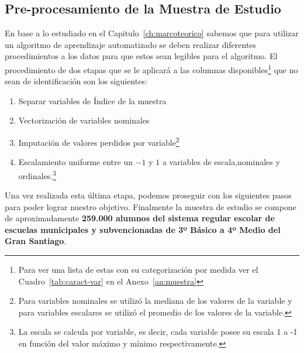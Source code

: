 \subsection{Pre-procesamiento de la Muestra de Estudio}
En base a lo estudiado en el Capitulo~\ref{ch:marcoteorico} sabemos que para utilizar un algoritmo de aprendizaje automatizado se deben realizar diferentes procedimientos a los datos para que estos sean legibles para el algoritmo. El procedimiento de dos etapas que se le aplicará a las columnas disponibles\footnote{Para ver una lista de estas con su categorización por medida ver el Cuadro~\ref{tab:caract-var} en el Anexo~\ref{an:muestra}} que no sean de identificación son los siguientes:
\begin{enumerate}[label=\Roman*]
\item Separar variables de Índice de la muestra
\item Vectorización de variables nominales
\item Imputación de valores perdidos por variable\footnote{Para variables nominales se utilizó la mediana de los valores de la variable y para variables escalares se utilizó el promedio de los valores de la variable. }
\item Escalamiento uniforme entre un $-1$ y $1$ a variables de escala,nominales y ordinales.\footnote{La escala se calcula por variable, es decir, cada variable posee su escala 1 a -1 en función del valor máximo y mínimo respectivamente.}
\end{enumerate}

Una vez realizada esta última etapa, podemos proseguir con los siguientes pasos para poder lograr nuestro objetivo. Finalmente la muestra de estudio se compone de aproximadamente \textbf{259.000 alumnos del sistema regular escolar de escuelas municipales y subvencionadas de 3º Básico a 4º Medio del Gran Santiago}.



